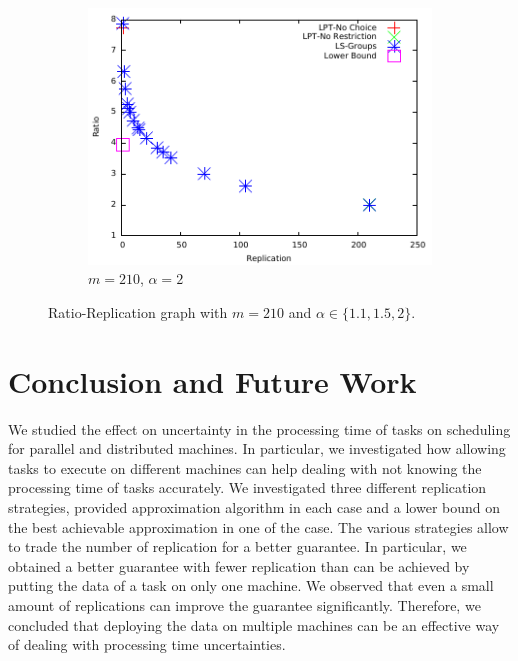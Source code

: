 \documentclass[10pt, conference, compsocconf]{IEEEtran}
\begin{document}
\begin {figure}
  \begin{subfigure}[b]{0.5\textwidth}
    \includegraphics[width=\textwidth]{alpha_2.pdf}
    \caption{$m=210$, $\alpha=2$}
    \label{fig:3}
  \end{subfigure} %

  \caption{Ratio-Replication graph with $m=210$ and $\alpha \in \{1.1, 1.5, 2\}$.}
  \label{fig:Graph}
\end{figure}

\section{Conclusion and Future Work}\label{sec8}

We studied the effect on uncertainty in the processing time of tasks
on scheduling for parallel and distributed machines. In particular, we
investigated how allowing tasks to execute on different machines can
help dealing with not knowing the processing time of tasks
accurately. We investigated three different replication strategies,
provided approximation algorithm in each case and a lower bound on the
best achievable approximation in one of the case. The various
strategies allow to trade the number of replication for a better
guarantee. In particular, we obtained a better guarantee with fewer
replication than can be achieved by putting the data of a task on only
one machine. We observed that even a small amount of replications can
improve the guarantee significantly. Therefore, we concluded that
deploying the data on multiple machines can be an effective way of
dealing with processing time uncertainties.
\end{document}
